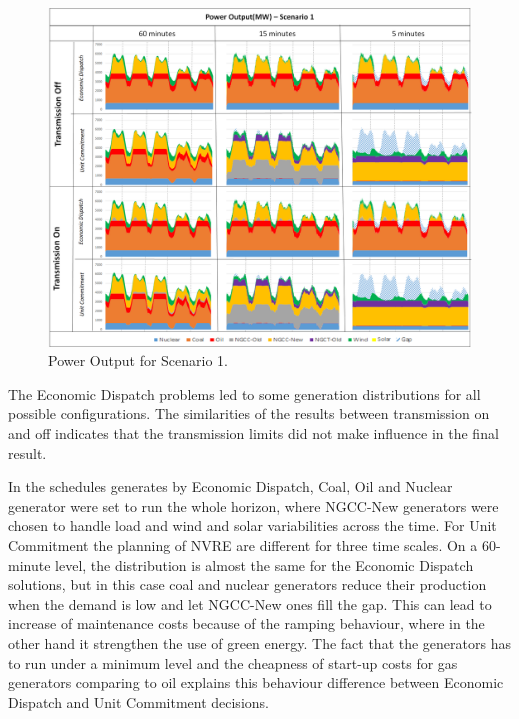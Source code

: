 \documentclass[12pt,LUDisStyle,twosided]{book}
\begin{document}
\begin{figure} 
  \centering
  
	  \includegraphics[width=\textwidth,height=\textheight,keepaspectratio]{PowerOutputScenario1.png}
  
  \caption{Power Output for Scenario 1.}
  \label{fig:powerOutputScenario1}
\end{figure}



The Economic Dispatch problems led to some generation distributions for all possible configurations. The similarities of the results between transmission on and off indicates that the transmission limits did not make influence in the final result. 


In the schedules generates by Economic Dispatch, Coal, Oil and Nuclear generator were set to run the whole horizon, where NGCC-New generators were chosen to handle load and wind and solar variabilities across the time. For Unit Commitment the planning of NVRE are different for three time scales. On a 60-minute level, the distribution is almost the same for the Economic Dispatch solutions, but in this case coal and nuclear generators reduce their production when the demand is low and let NGCC-New ones fill the gap. This can lead to increase of maintenance costs because of the ramping behaviour, where in the other hand it strengthen the use of green energy. The fact that the generators has to run under a minimum level and the cheapness of start-up costs for gas generators comparing to oil explains this behaviour difference between Economic Dispatch and Unit Commitment decisions.
\end{document}
